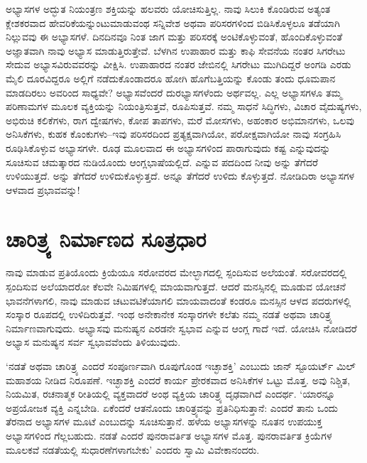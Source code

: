 ಅಭ್ಯಾಸಗಳ ಅದ್ಭುತ ನಿಯಂತ್ರಣ ಶಕ್ತಿಯನ್ನು ಹಲವರು ಯೋಚಿಸುತ್ತಿಲ್ಲ. ನಾವು ಸಿಲುಕಿ ಕೊಂಡಿರುವ ಅತ್ಯಂತ ಕ್ಲೇಶಕರವಾದ ಹೇವರಿಕೆಯನ್ನುಂಟುಮಾಡುವಂಥ ಸನ್ನಿವೇಶ ಅಥವಾ ಪರಿಸರಗಳಿಂದ ಬಿಡಿಸಿಕೊಳ್ಳಲೂ ತಡೆಯಾಗಿ ನಿಲ್ಲುವವು ಈ ಅಭ್ಯಾಸಗಳೆ. ದಿನದಿನವೂ ನಿಂತ ಜಾಗ ಮತ್ತು ಪರಿಸರಕ್ಕೆ ಅಂಟಿಕೊಳ್ಳುವಂತೆ, ಹೊಂದಿಕೊಳ್ಳುವಂತೆ ಅಜ್ಞಾತವಾಗಿ ನಾವು ಅಭ್ಯಾಸ ಮಾಡುತ್ತಿರುತ್ತೇವೆ. ಬೆಳಗಿನ ಉಪಾಹಾರ ಮತ್ತು ಕಾಫಿ ಸೇವನೆಯ ನಂತರ ಸಿಗರೇಟು ಸೇದುವ ಅಭ್ಯಾಸವಿರುವವರನ್ನು ವೀಕ್ಷಿಸಿ. ಉಪಾಹಾರದ ನಂತರ ಜೇಬಿನಲ್ಲಿ ಸಿಗರೇಟು ಮುಗಿದಿದ್ದರೆ ಅಂಗಡಿ ಎರಡು ಮೈಲಿ ದೂರವಿದ್ದರೂ ಅಲ್ಲಿಗೆ ನಡೆದುಕೊಂಡಾದರೂ ಹೋಗಿ ಹೊಗೆಬತ್ತಿಯನ್ನು ಕೊಂಡು ತಂದು ಧೂಮಪಾನ ಮಾಡದಿರಲು ಅವರಿಂದ ಸಾಧ್ಯವೇ? ಅಭ್ಯಾಸವೆಂದರೆ ದುರಭ್ಯಾಸಗಳೆಂದು ಅರ್ಥವಲ್ಲ. ಎಲ್ಲ ಅಭ್ಯಾಸಗಳೂ ತಮ್ಮ ಪರಿಣಾಮಗಳ ಮೂಲಕ ವ್ಯಕ್ತಿಯನ್ನು ನಿಯಂತ್ರಿಸುತ್ತವೆ, ರೂಪಿಸುತ್ತವೆ. ನಮ್ಮ ಸಾಧನೆ ಸಿದ್ಧಿಗಳು, ವಿಚಾರ ವೈದುಷ್ಯಗಳು, ಅಭಿರುಚಿ ಕಲಿಕೆಗಳು, ರಾಗ ದ್ವೇಷಗಳು, ಕೋಪ ತಾಪಗಳು, ಮರೆ ಮೋಸಗಳು, ಅಹಂಕಾರ ಅಭಿಮಾನಗಳು, ಒಲವು ಅನಿಸಿಕೆಗಳು, ಕುಹಕ ಕೊಂಕುಗಳು–ಇವು ಪರಿಸರದಿಂದ ಪ್ರತ್ಯಕ್ಷವಾಗಿಯೋ, ಪರೋಕ್ಷವಾಗಿಯೋ ನಾವು ಸಂಗ್ರಹಿಸಿ ರೂಢಿಸಿಕೊಳ್ಳುವ ಅಭ್ಯಾಸಗಳೇ. ರೂಢ ಮೂಲವಾದ ಈ ಅಭ್ಯಾಸಗಳಿಂದ ಪಾರಾಗುವುದು ಕಷ್ಟ ಎನ್ನುವುದನ್ನು ಸೂಚಿಸುವ ಚಮತ್ಕಾರದ ನುಡಿಯೊಂದು ಆಂಗ್ಲಭಾಷೆಯಲ್ಲಿದೆ.  ಎನ್ನುವ ಪದದಿಂದ ನೀವು ಅನ್ನು ತೆಗೆದರೆ  ಉಳಿಯುತ್ತದೆ.  ಅನ್ನು ತೆಗೆದರೆ  ಉಳಿದುಕೊಳ್ಳುತ್ತದೆ.  ಅನ್ನೂ ತೆಗೆದರೆ  ಉಳಿದು ಕೊಳ್ಳುತ್ತದೆ. ನೋಡಿದಿರಾ ಅಭ್ಯಾಸಗಳ ಆಳವಾದ ಪ್ರಭಾವವನ್ನು!


\section*{ಚಾರಿತ್ರ್ಯ ನಿರ್ಮಾಣದ ಸೂತ್ರಧಾರ}


ನಾವು ಮಾಡುವ ಪ್ರತಿಯೊಂದು ಕ್ರಿಯೆಯೂ ಸರೋವರದ ಮೇಲ್ಭಾಗದಲ್ಲಿ ಸ್ಪಂದಿಸುವ ಅಲೆಯಂತೆ. ಸರೋವರದಲ್ಲಿ ಸ್ಪಂದಿಸುವ ಅಲೆಯಾದರೋ ಕೆಲವೇ ನಿಮಿಷಗಳಲ್ಲಿ ಮಾಯವಾಗುತ್ತದೆ. ಆದರೆ ಮನಸ್ಸಿನಲ್ಲಿ ಮೂಡುವ ಯೋಚನೆ ಭಾವನೆಗಳಾಗಲಿ, ನಾವು ಮಾಡುವ ಚಟುವಟಿಕೆಯಾಗಲಿ ಮಾಯವಾದಂತೆ ಕಂಡರೂ ಮನಸ್ಸಿನ ಆಳದ ಪದರುಗಳಲ್ಲಿ ಸಂಸ್ಕಾರ ರೂಪದಲ್ಲಿ ಉಳಿದಿರುತ್ತವೆ. ಇಂಥ ಅನೇಕಾನೇಕ ಸಂಸ್ಕಾರಗಳೇ ಕಲೆತು ನಮ್ಮ ನಡತೆ ಅಥವಾ ಚಾರಿತ್ರ್ಯ ನಿರ್ಮಾಣವಾಗುವುದು. ಅಭ್ಯಾಸವು ಮನುಷ್ಯನ ಎರಡನೇ ಸ್ವಭಾವ ಎನ್ನುವ ಆಂಗ್ಲ ಗಾದೆ ಇದೆ. ಯೋಚಿಸಿ ನೋಡಿದರೆ ಅಭ್ಯಾಸ ಮನುಷ್ಯನ ಸರ್ವ ಸ್ವಭಾವವೆಂದು ತಿಳಿಯುವುದು.

‘ನಡತೆ ಅಥವಾ ಚಾರಿತ್ರ್ಯ ಎಂದರೆ ಸಂಪೂರ್ಣವಾಗಿ ರೂಪುಗೊಂಡ ಇಚ್ಛಾಶಕ್ತಿ’ ಎಂಬುದು ಜಾನ್ ಸ್ಟೂಯರ್ಟ್ ಮಿಲ್ ಮಹಾಶಯ ನೀಡಿದ ನಿರೂಪಣೆ. ಇಚ್ಛಾಶಕ್ತಿ ಎಂದರೆ ಕಾರ್ಯ ಪ್ರೇರಕವಾದ ಅನಿಸಿಕೆಗಳ ಒಟ್ಟು ಮೊತ್ತ. ಅವು ನಿಶ್ಚಿತ, ನಿಯಮಿತ, ರಚನಾತ್ಮಕ ರೀತಿಯಲ್ಲಿ ವ್ಯಕ್ತವಾದರೆ ಅಂಥ ವ್ಯಕ್ತಿಯ ಚಾರಿತ್ರ್ಯ ದೃಢವಾಗಿದೆ ಎಂದರ್ಥ. ‘ಯಾರನ್ನೂ ಅಪ್ರಯೋಜಕ ವ್ಯಕ್ತಿ ಎನ್ನಬೇಡಿ. ಏಕೆಂದರೆ ಆತನೊಂದು ಚಾರಿತ್ರ್ಯವನ್ನು ಪ್ರತಿನಿಧಿಸುತ್ತಾನೆ: ಎಂದರೆ ತಾನು ಒಂದು ತೆರನಾದ ಅಭ್ಯಾಸಗಳ ಮೂಟೆ ಎಂಬುದನ್ನು ಸೂಚಿಸುತ್ತಾನೆ. ಹಳೆಯ ಅಭ್ಯಾಸಗಳನ್ನು ನೂತನ ಉಪಯುಕ್ತ ಅಭ್ಯಾಸಗಳಿಂದ ಗೆಲ್ಲಬಹುದು. ನಡತೆ ಎಂದರೆ ಪುನರಾವರ್ತಿತ ಅಭ್ಯಾಸಗಳ ಮೊತ್ತ. ಪುನರಾವರ್ತಿತ ಕ್ರಿಯೆಗಳ ಮೂಲಕವೆ ನಡತೆಯಲ್ಲಿ ಸುಧಾರಣೆಗಳಾಗಬೇಕು’ ಎಂದರು ಸ್ವಾಮಿ ವಿವೇಕಾನಂದರು.

